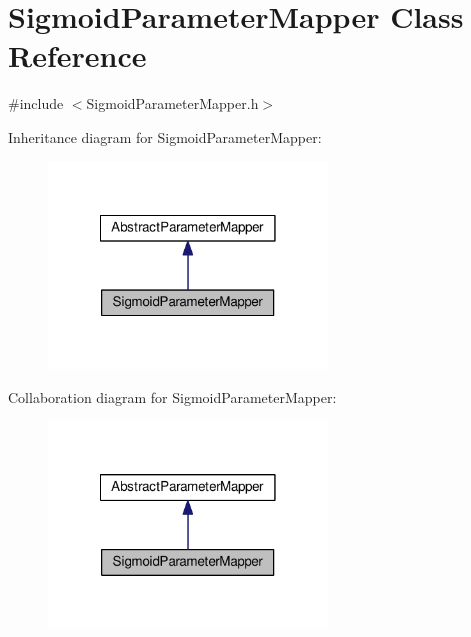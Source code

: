 \hypertarget{classSigmoidParameterMapper}{}\section{Sigmoid\+Parameter\+Mapper Class Reference}
\label{classSigmoidParameterMapper}


{\ttfamily \#include $<$Sigmoid\+Parameter\+Mapper.\+h$>$}



Inheritance diagram for Sigmoid\+Parameter\+Mapper\+:\nopagebreak
\begin{figure}[H]
\begin{center}
\leavevmode
\includegraphics[width=210pt]{classSigmoidParameterMapper__inherit__graph}
\end{center}
\end{figure}


Collaboration diagram for Sigmoid\+Parameter\+Mapper\+:\nopagebreak
\begin{figure}[H]
\begin{center}
\leavevmode
\includegraphics[width=210pt]{classSigmoidParameterMapper__coll__graph}
\end{center}
\end{figure}
